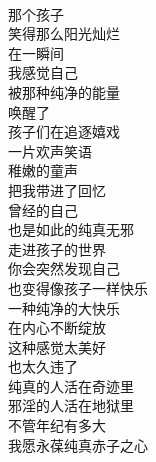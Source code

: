 \begin{poem}[依旧纯真]
    \begin{multicols}{2}
        \begin{center}~\\
            那个孩子 \\ 笑得那么阳光灿烂 \\ 在一瞬间 \\ 我感觉自己 \\ 被那种纯净的能量 \\ 唤醒了 \\ 孩子们在追逐嬉戏 \\ 一片欢声笑语 \\ 稚嫩的童声 \\ 把我带进了回忆 \\ 曾经的自己 \\ 也是如此的纯真无邪 \\ 走进孩子的世界 \\ 你会突然发现自己 \\ 也变得像孩子一样快乐 \\ 一种纯净的大快乐 \\ 在内心不断绽放 \\ 这种感觉太美好 \\ 也太久违了 \\ 纯真的人活在奇迹里 \\ 邪淫的人活在地狱里 \\ 不管年纪有多大 \\ 我愿永葆纯真赤子之心
        \end{center}
    \end{multicols}
\end{poem}

